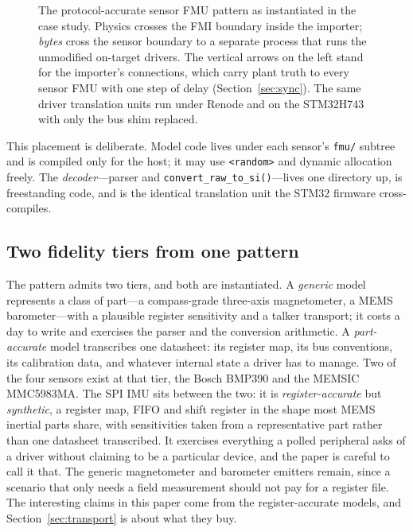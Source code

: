\documentclass[preprint,12pt,a4paper]{elsarticle}
\newcommand{\code}[1]{\texttt{\small #1}}
\begin{document}
\begin{figure}[tbp]
\caption{The protocol-accurate sensor FMU pattern as instantiated in the case
study. Physics crosses the FMI boundary inside the importer; \emph{bytes}
cross the sensor boundary to a separate process that runs the unmodified
on-target drivers. The vertical arrows on the left stand for the importer's
connections, which carry plant truth to every sensor FMU with one step of
delay (Section~\ref{sec:sync}). The same driver translation units run under
Renode and on the STM32H743 with only the bus shim replaced.}
\label{fig:pattern}
\end{figure}

This placement is deliberate. Model code lives under each sensor's \code{fmu/}
subtree and is compiled only for the host; it may use \code{<random>} and
dynamic allocation freely. The \emph{decoder}---parser and
\code{convert\_raw\_to\_si()}---lives one directory up, is freestanding code, and is the identical translation unit the STM32 firmware
cross-compiles.

\subsection{Two fidelity tiers from one pattern}
\label{sec:tiers}
The pattern admits two tiers, and both are instantiated. A \emph{generic} model
represents a class of part---a compass-grade three-axis magnetometer, a MEMS
barometer---with a plausible register sensitivity and a talker transport; it
costs a day to write and exercises the parser and the conversion arithmetic. A
\emph{part-accurate} model transcribes one datasheet: its register map, its bus
conventions, its calibration data, and whatever internal state a driver has to
manage. Two of the four sensors exist at that tier, the Bosch BMP390 and the
MEMSIC MMC5983MA. The SPI IMU sits between the two: it is
\emph{register-accurate} but \emph{synthetic}, a register map, FIFO and shift
register in the shape most MEMS inertial parts share, with sensitivities taken
from a representative part rather than one datasheet transcribed. It exercises
everything a polled peripheral asks of a driver without claiming to be a
particular device, and the paper is careful to call it that. The generic
magnetometer and barometer emitters remain, since a scenario
that only needs a field measurement should not pay for a register file. The
interesting claims in this paper come from the register-accurate models, and
Section~\ref{sec:transport} is about what they buy.
\end{document}
